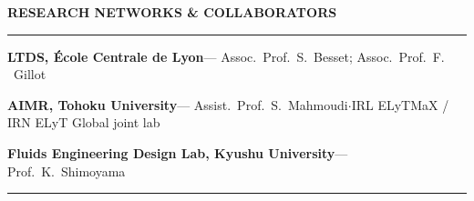 \documentclass[a4paper,10pt]{article}
\newlength{\fullW}\setlength{\fullW}{188mm}
\newcommand{\mainsecW}[1]{%
  \vspace{5pt}%
  {\color{accent}\small\bfseries\MakeUppercase{#1}}\par
  {\color{linecolor}\rule{\fullW}{0.8pt}}\par\vspace{2pt}%
}
\begin{document}
\begin{minipage}[t]{\fullW}
\mainsecW{Research Networks \& Collaborators}
{\footnotesize\color{bodytext}%
{\color{darktext}\bfseries LTDS, \'Ecole Centrale de Lyon}\enspace---\enspace
  Assoc.\ Prof.\ S.\ Besset; Assoc.\ Prof.\ F. \ Gillot\par\vspace{2pt}
{\color{darktext}\bfseries AIMR, Tohoku University}\enspace---\enspace
  Assist.\ Prof.\ S.\ Mahmoudi\enspace$\cdot$\enspace IRL ELyTMaX / IRN ELyT Global joint lab\par\vspace{2pt}
{\color{darktext}\bfseries Fluids Engineering Design Lab, Kyushu University}\enspace---\enspace
  Prof.\ K.\ Shimoyama\par\vspace{2pt}

}
\vfill
{\color{linecolor!60}\rule{\fullW}{0.4pt}}

\end{minipage}
 
\end{document}
